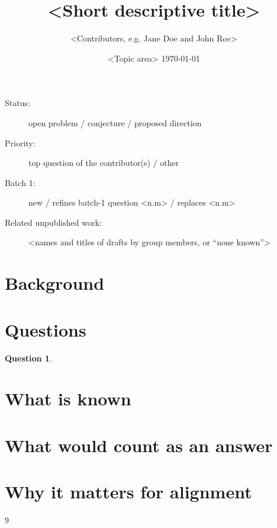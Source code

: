 \documentclass[11pt]{article}
\title{<Short descriptive title>}
\author{<Contributors, e.g. Jane Doe and John Roe>}
\date{<Topic area> \quad\textbullet\quad \today}
\newtheorem{question}{Question}
\theoremstyle{definition}
\theoremstyle{remark}
\begin{document}
\maketitle

\begin{description}
  \item[Status:] open problem / conjecture / proposed direction
  \item[Priority:] top question of the contributor(s) / other
  \item[Batch 1:] new / refines batch-1 question <n.m> / replaces <n.m>
  \item[Related unpublished work:] <names and titles of drafts by group members, or ``none known''>
\end{description}

\section*{Background}

\section*{Questions}

\begin{question}\label{q:main}
\end{question}

\section*{What is known}

\section*{What would count as an answer}

\section*{Why it matters for alignment}

\begin{thebibliography}{9}
\end{thebibliography}
\end{document}
